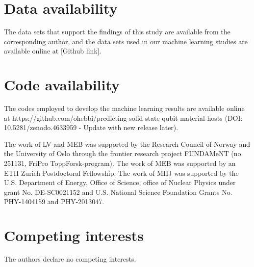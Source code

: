 \documentclass[superscriptaddress,unsortedaddress,
 amsmath,amssymb,
 aps,
]{revtex4-2}
\begin{document}
\section*{Data availability} 

The data sets that support the findings of this study are available from the corresponding author, and the data sets used in our  machine learning studies are available online at [Github link]. 

\section*{Code availability} 
The codes employed to develop the machine learning results are available online at https://github.com/ohebbi/predicting-solid-state-qubit-material-hosts (DOI: 10.5281/zenodo.4633959 - Update with new release later). %


\begin{acknowledgments}

The work of LV and MEB was supported by the Research Council of Norway and the University of Oslo through the frontier research project FUNDAMeNT (no. 251131, FriPro ToppForsk-program). 
The work of MEB was supported by an ETH Zurich Postdoctoral Fellowship. 
The work of MHJ was supported by the U.S. Department of Energy,
Office of Science, office of Nuclear Physics under grant
No. DE-SC0021152 and U.S. National Science Foundation Grants
No. PHY-1404159 and PHY-2013047. 


\end{acknowledgments}


\section*{Competing interests}
The authors declare no competing interests.
\end{document}
